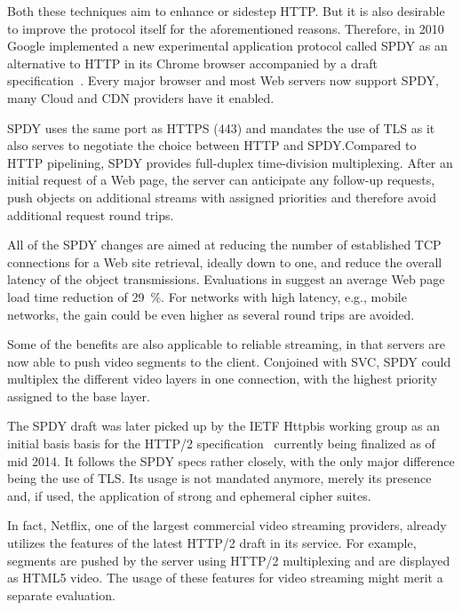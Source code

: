 Both these techniques aim to enhance or sidestep \gls{HTTP}. But it is also desirable to improve the protocol itself for the aforementioned reasons. Therefore, in 2010 Google implemented a new experimental application protocol called SPDY as an alternative to \gls{HTTP} in its Chrome browser accompanied by a draft specification~\cite{google2011SPDYdef, google2010SPDYwp}. Every major browser and most Web servers now support SPDY, many Cloud and \gls{CDN} providers have it enabled.

SPDY uses the same port as \acrshort{HTTPS} (443) and mandates the use of \gls{TLS} as it also serves to negotiate the choice between \gls{HTTP} and SPDY.\@ Compared to \gls{HTTP} pipelining, SPDY provides full-duplex time-division multiplexing. After an initial request of a Web page, the server can anticipate any follow-up requests, push objects on additional streams with assigned priorities and therefore avoid additional request round trips.

All of the SPDY changes are aimed at reducing the number of established \gls{TCP} connections for a Web site retrieval, ideally down to one, and reduce the overall latency of the object transmissions. Evaluations in \cite{google2010SPDYwp} suggest an average Web page load time reduction of \SI{29}{\percent}. For networks with high latency, e.g., mobile networks, the gain could be even higher as several round trips are avoided.

Some of the benefits are also applicable to reliable streaming, in that servers are now able to push video segments to the client. Conjoined with \gls{SVC}, SPDY could multiplex the different video layers in one connection, with the highest priority assigned to the base layer.

The SPDY draft was later picked up by the \gls{IETF} Httpbis working group as an initial basis basis for the \gls{HTTP}/2 specification~\cite{http20draft} currently being finalized as of mid 2014. It follows the SPDY specs rather closely, with the only major difference being the use of \gls{TLS}. Its usage is not mandated anymore, merely its presence and, if used, the application of strong and ephemeral cipher suites.

In fact, Netflix, one of the largest commercial video streaming providers, already utilizes the features of the latest \gls{HTTP}/2 draft in its service. For example, segments are pushed by the server using \gls{HTTP}/2 multiplexing and are displayed as \gls{HTML}5 video. The usage of these features for video streaming might merit a separate evaluation.


